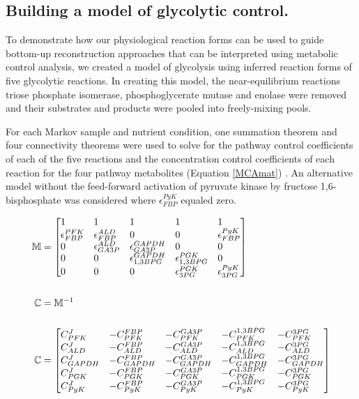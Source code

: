 \documentclass[12pt]{nature}\usepackage{graphicx, color}
\begin{document}
\subsection{Building a model of glycolytic control.}

To demonstrate how our physiological reaction forms can be used to guide bottom-up reconstruction approaches that can be interpreted using metabolic control analysis, we created a model of glycolysis using inferred reaction forms of five glycolytic reactions.  In creating this model, the near-equilibrium reactions triose phosphate isomerase, phosphoglycerate mutase and enolase were removed and their substrates and products were pooled into freely-mixing pools.

For each Markov sample and nutrient condition, one summation theorem and four connectivity theorems were used to solve for the pathway control coefficients of each of the five reactions and the concentration control coefficients of each reaction for the four pathway metabolites (Equation \ref{MCAmat}) \cite{main-Westerhoff:1987jo}.  An alternative model without the feed-forward activation of pyruvate kinase by fructose 1,6-bisphosphate was considered where $\epsilon^{PyK}_{FBP}$ equaled zero.  

\begin{align}
\mathbb{M} &= \begin{bmatrix*}[l]
  1 & 1 & 1 & 1 & 1 \\
  \epsilon^{PFK}_{FBP} & \epsilon^{ALD}_{FBP} & 0 & 0 & \epsilon^{PyK}_{FBP} \\
  0 & \epsilon^{ALD}_{GA3P} & \epsilon^{GAPDH}_{GA3P} & 0 & 0 \\
  0 & 0 & \epsilon^{GAPDH}_{1,3BPG} & \epsilon^{PGK}_{1,3BPG} & 0 \\
  0 & 0 & 0 & \epsilon^{PGK}_{3PG} & \epsilon^{PyK}_{3PG} \\
 \end{bmatrix*}\notag\\\notag\\
  \mathbb{C} &= \mathbb{M}^{-1}\notag\\\notag\\
 \mathbb{C} &= \begin{bmatrix*}[l]
  C^{J}_{PFK} & -C^{FBP}_{PFK} & -C^{GA3P}_{PFK} & -C^{1,3BPG}_{PFK} & -C^{3PG}_{PFK} \\
  C^{J}_{ALD} & -C^{FBP}_{ALD} & -C^{GA3P}_{ALD} & -C^{1,3BPG}_{ALD} & -C^{3PG}_{ALD} \\
  C^{J}_{GAPDH} & -C^{FBP}_{GAPDH} & -C^{GA3P}_{GAPDH} & -C^{1,3BPG}_{GAPDH} & -C^{3PG}_{GAPDH} \\
  C^{J}_{PGK} & -C^{FBP}_{PGK} & -C^{GA3P}_{PGK} & -C^{1,3BPG}_{PGK} & -C^{3PG}_{PGK} \\
  C^{J}_{PyK} & -C^{FBP}_{PyK} & -C^{GA3P}_{PyK} & -C^{1,3BPG}_{PyK} & -C^{3PG}_{PyK}
 \end{bmatrix*}\label{MCAmat}
\end{align}
\end{document}
